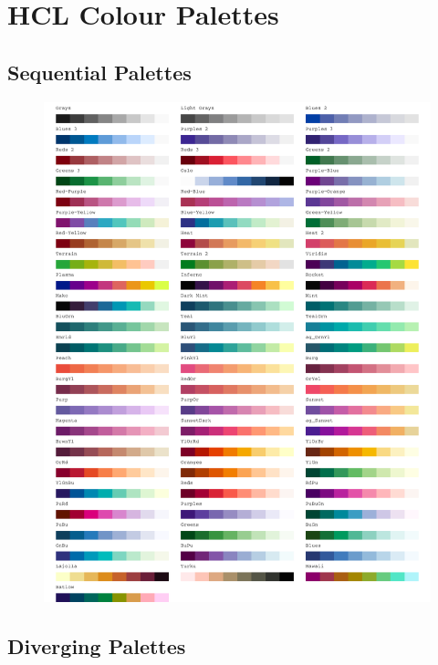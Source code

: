 \chapter{HCL Colour Palettes}
\label{sec:AppendixPalettes}

\clearpage

\section{Sequential Palettes}

\vspace{2em}

\begin{figure}[H]
\centering
\includegraphics[width = \textwidth]{graphics/appFigs/hcl_pals_seq.pdf}
\end{figure}

\vfill
\clearpage

\section{Diverging Palettes}

